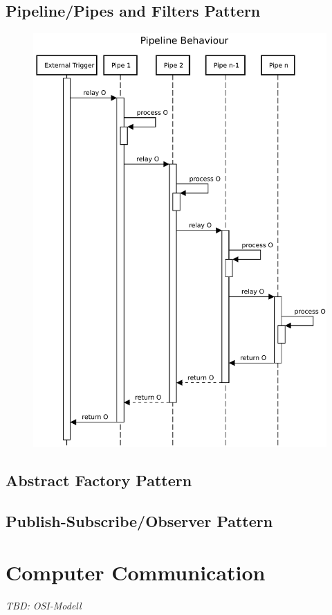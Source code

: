 \subsection{Pipeline/Pipes and Filters Pattern}
\begin{figure}[h!]
    \centering
    \includegraphics[width=12cm]{img/ch04/pipeline-behaviour.pdf}
    \label{fig:dp-pipes-filters}
\end{figure}
\subsection{Abstract Factory Pattern}
\subsection{Publish-Subscribe/Observer Pattern}

\section{Computer Communication}
\label{sec:computer-networks}
\emph{TBD: OSI-Modell} %

